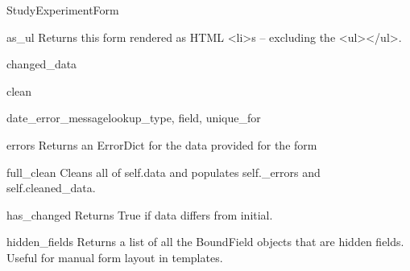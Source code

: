 \documentclass[letterpaper,10pt,english]{sphinxmanual}
\begin{document}
\begin{classdesc}{StudyExperimentForm}
\hypertarget{data.forms.StudyExperimentForm.as_ul}{}\begin{methoddesc}[StudyExperimentForm]{as\_ul}{}
Returns this form rendered as HTML \textless{}li\textgreater{}s -- excluding the \textless{}ul\textgreater{}\textless{}/ul\textgreater{}.
\end{methoddesc}

\hypertarget{data.forms.StudyExperimentForm.changed_data}{}\begin{memberdesc}[StudyExperimentForm]{changed\_data}\end{memberdesc}

\hypertarget{data.forms.StudyExperimentForm.clean}{}\begin{methoddesc}[StudyExperimentForm]{clean}{}\end{methoddesc}

\hypertarget{data.forms.StudyExperimentForm.date_error_message}{}\begin{methoddesc}[StudyExperimentForm]{date\_error\_message}{lookup\_type, field, unique\_for}\end{methoddesc}

\hypertarget{data.forms.StudyExperimentForm.errors}{}\begin{memberdesc}[StudyExperimentForm]{errors}
Returns an ErrorDict for the data provided for the form
\end{memberdesc}

\hypertarget{data.forms.StudyExperimentForm.full_clean}{}\begin{methoddesc}[StudyExperimentForm]{full\_clean}{}
Cleans all of self.data and populates self.\_errors and
self.cleaned\_data.
\end{methoddesc}

\hypertarget{data.forms.StudyExperimentForm.has_changed}{}\begin{methoddesc}[StudyExperimentForm]{has\_changed}{}
Returns True if data differs from initial.
\end{methoddesc}

\hypertarget{data.forms.StudyExperimentForm.hidden_fields}{}\begin{methoddesc}[StudyExperimentForm]{hidden\_fields}{}
Returns a list of all the BoundField objects that are hidden fields.
Useful for manual form layout in templates.
\end{methoddesc}


\end{classdesc}
\end{document}
